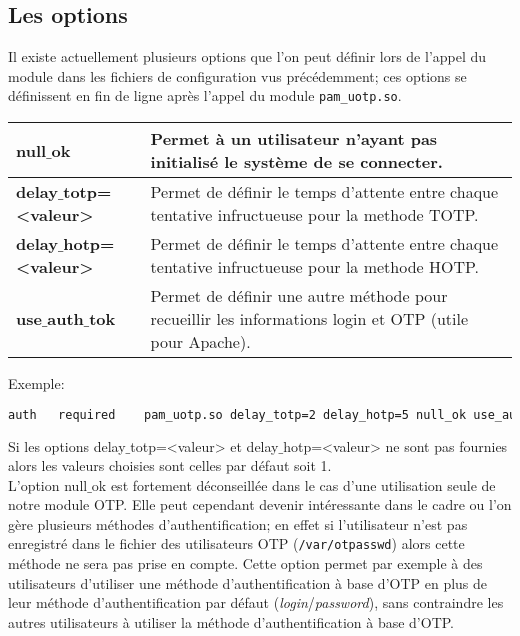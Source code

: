 \documentclass{"../../../res/univ-projet"}
\begin{document}
\subsection{Les options}
Il existe actuellement plusieurs options que l'on peut définir lors de l'appel du module
dans les fichiers de configuration vus précédemment; ces options se définissent en fin de 
ligne après l'appel du module \verb?pam_uotp.so?.
\newline
\begin{tabular}{|p{}p{}|}
\hline
\textbf{null$\_$ok} & Permet à un utilisateur n'ayant pas initialisé le système de se connecter.\\
\hline
\textbf{delay$\_$totp=<valeur>} & Permet de définir le temps d'attente entre 
chaque tentative infructueuse pour la methode TOTP.\\
\hline
\textbf{delay$\_$hotp=<valeur>} & Permet de définir le temps d'attente entre 
chaque tentative infructueuse pour la methode HOTP.\\
\hline
\textbf{use$\_$auth$\_$tok} & Permet de définir une autre méthode pour recueillir 
les informations login et OTP (utile pour Apache).\\
\hline
\end{tabular}
Exemple:
\begin{lstlisting}[language=bash, backgroundcolor=\color{black}, basicstyle=\color{white}]
auth   required    pam_uotp.so delay_totp=2 delay_hotp=5 null_ok use_auth_tok
\end{lstlisting}

Si les options delay$\_$totp=<valeur> et delay$\_$hotp=<valeur> ne sont pas fournies alors
les valeurs choisies sont celles par défaut soit 1.\\
L'option null$\_$ok est fortement déconseillée dans le cas d'une utilisation seule de notre module OTP.
Elle peut cependant devenir intéressante dans le cadre ou l'on gère plusieurs méthodes d'authentification;
en effet si l'utilisateur n'est pas enregistré dans le fichier des utilisateurs OTP (\verb?/var/otpasswd?)
alors cette méthode ne sera pas prise en compte. Cette option permet par exemple à des utilisateurs d'utiliser
une méthode d'authentification à base d'OTP en plus de leur méthode d'authentification par défaut 
(\textit{login}/\textit{password}), sans contraindre les autres utilisateurs à utiliser la 
méthode d'authentification à base d'OTP.\\
\end{document}

